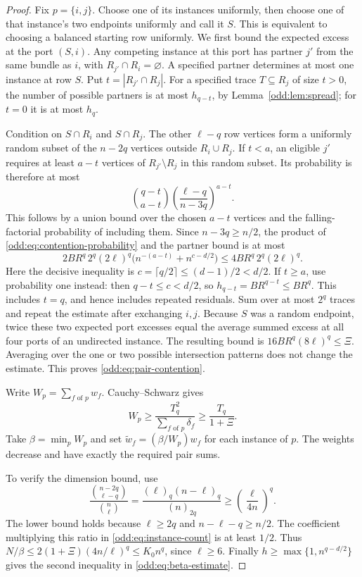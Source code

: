 \documentclass[letterpaper,11pt]{article}
\theoremstyle{definition}
\begin{document}
\begin{proof}
Fix $p=\{i,j\}$.  Choose one of its instances uniformly, then choose one
of that instance's two endpoints uniformly and call it $S$.  This is
equivalent to choosing a balanced starting row uniformly.  We first bound
the expected excess at the port $(S,i)$.
Any competing instance at this port has partner $j'$ from the same
bundle as $i$, with $R_{j'}\cap R_i=\varnothing$.  A specified partner
determines at most one instance at row $S$.  Put
$t=|R_{j'}\cap R_j|$.  For a specified trace $T\subseteq R_j$ of size
$t>0$, the number of possible partners is at most $h_{q-t}$, by
Lemma~\ref{odd:lem:spread}; for $t=0$ it is at most $h_q$.

Condition on $S\cap R_i$ and $S\cap R_j$.  The other $\ell-q$ row
vertices form a uniformly random subset of the $n-2q$ vertices outside
$R_i\cup R_j$.  If $t<a$, an eligible $j'$ requires at least $a-t$
vertices of $R_{j'}\setminus R_j$ in this random subset.  Its probability
is therefore at most
\begin{equation}\label{odd:eq:contention-probability}
 \binom{q-t}{a-t}
 \left(\frac{\ell-q}{n-3q}\right)^{a-t}.
\end{equation}
This follows by a union bound over the chosen $a-t$ vertices and the
falling-factorial probability of including them.  Since $n-3q\geq n/2$,
the product of \eqref{odd:eq:contention-probability} and the partner bound
is at most
\[
 2BR^q\,2^q(2\ell)^q
 \bigl(n^{-(a-t)}+n^{c-d/2}\bigr)
 \leq4BR^q\,2^q(2\ell)^q.
\]
Here the decisive inequality is
$c=\lceil q/2\rceil\leq(d-1)/2<d/2$.  If $t\geq a$, use probability
one instead: then $q-t\leq c<d/2$, so $h_{q-t}=BR^{q-t}\leq BR^q$.
This includes $t=q$, and hence includes repeated residuals.  Sum over at
most $2^q$ traces and repeat the estimate after exchanging $i,j$.
Because $S$ was a random endpoint, twice these two expected port excesses
equal the average summed excess at all four ports of an undirected
instance.  The resulting bound is
$16BR^q(8\ell)^q\leq\Xi$.  Averaging over the one or two possible
intersection patterns does not change the estimate.  This proves
\eqref{odd:eq:pair-contention}.

Write $W_p=\sum_{f\text{ of }p}w_f$.  Cauchy--Schwarz gives
\[
 W_p\geq\frac{T_q^2}{\sum_{f\text{ of }p}\delta_f}
 \geq\frac{T_q}{1+\Xi}.
\]
Take $\beta=\min_pW_p$ and set
$\widetilde w_f=(\beta/W_p)w_f$ for each instance of $p$.
The weights decrease and have exactly the required pair sums.

To verify the dimension bound, use
\[
 \frac{\binom{n-2q}{\ell-q}}{\binom n\ell}
 =\frac{(\ell)_q(n-\ell)_q}{(n)_{2q}}
 \geq\left(\frac{\ell}{4n}\right)^q.
\]
The lower bound holds because $\ell\geq2q$ and
$n-\ell-q\geq n/2$.  The coefficient multiplying this ratio in
\eqref{odd:eq:instance-count} is at least $1/2$.  Thus
$N/\beta\leq2(1+\Xi)(4n/\ell)^q\leq K_0n^q$, since $\ell\geq6$.
Finally $h\geq\max\{1,n^{q-d/2}\}$ gives the second inequality in
\eqref{odd:eq:beta-estimate}.
\end{proof}
\end{document}
